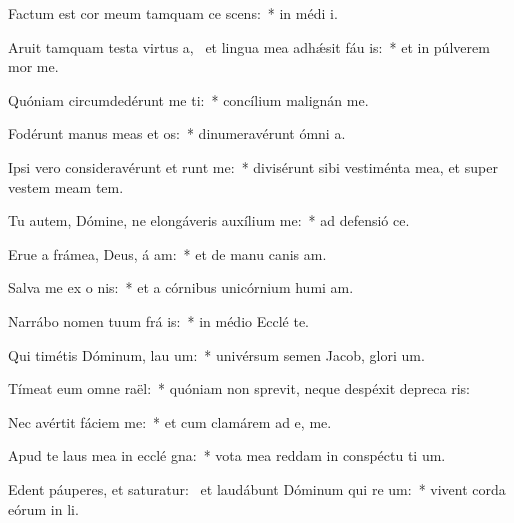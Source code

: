 \item Factum est cor meum tamquam ce scens:~* in médi  i.
\item Aruit tamquam testa virtus a,~\pscross{} et lingua mea adhǽsit fáu is:~* et in púlverem mor  me.
\item Quóniam circumdedérunt me  ti:~* concílium malignán  me.
\item Fodérunt manus meas et  os:~* dinumeravérunt ómni  a.
\item Ipsi vero consideravérunt et runt me:~* divisérunt sibi vestiménta mea, et super vestem meam  tem.
\item Tu autem, Dómine, ne elongáveris auxílium   me:~* ad defensió  ce.
\item Erue a frámea, Deus, á am:~* et de manu canis  am.
\item Salva me ex o nis:~* et a córnibus unicórnium humi am.
\item Narrábo nomen tuum frá is:~* in médio Ecclé  te.
\item Qui timétis Dóminum, lau um:~* univérsum semen Jacob, glori um.
\item Tímeat eum omne  raël:~* quóniam non sprevit, neque despéxit depreca ris:
\item Nec avértit fáciem   me:~* et cum clamárem ad e,  me.
\item Apud te laus mea in ecclé gna:~* vota mea reddam in conspéctu ti um.
\item Edent páuperes, et saturatur:~\pscross{} et laudábunt Dóminum qui re um:~* vivent corda eórum in  li.
